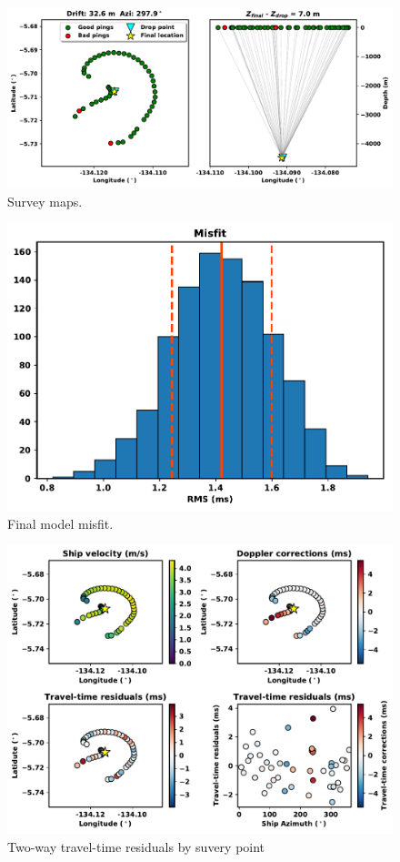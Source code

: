 \documentclass[titlepage, 12pt]{article}
\begin{document}
  \begin{figure}[!htb]
   \centering
   \includegraphics[width=0.9\linewidth]{maps.pdf}
   \caption{Survey maps.}
  \end{figure}
 
  \begin{figure}[!htb]
   \centering
   \includegraphics[width=0.7\linewidth]{misfit.pdf}
   \caption{Final model misfit.}
  \end{figure}

  \begin{figure}[!htb]
   \includegraphics[width=\linewidth]{tt_resids.pdf}
   \caption{Two-way travel-time residuals by suvery point}
  \end{figure}
  
\end{document}
